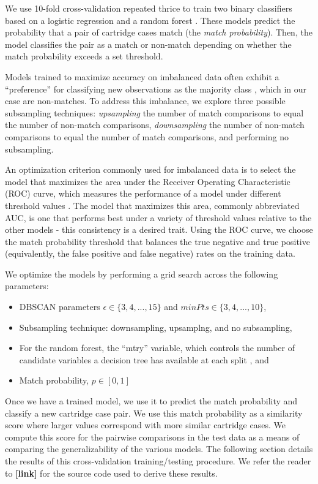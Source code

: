 \documentclass[reprint]{JASA}
\begin{document}
We use 10-fold cross-validation repeated thrice \citep{caret} to train
two binary classifiers based on a logistic regression and a random
forest \citep{breiman, randomForest}. These models predict the
probability that a pair of cartridge cases match (the \emph{match
probability}). Then, the model classifies the pair as a match or
non-match depending on whether the match probability exceeds a set
threshold.

Models trained to maximize accuracy on imbalanced data often exhibit a
``preference'' for classifying new observations as the majority class
\citep{Fernndez2018}, which in our case are non-matches. To address this
imbalance, we explore three possible subsampling techniques:
\emph{upsampling} the number of match comparisons to equal the number of
non-match comparisons, \emph{downsampling} the number of non-match
comparisons to equal the number of match comparisons, and performing no
subsampling.

An optimization criterion commonly used for imbalanced data is to select
the model that maximizes the area under the Receiver Operating
Characteristic (ROC) curve, which measures the performance of a model
under different threshold values \citep{James2013}. The model that
maximizes this area, commonly abbreviated AUC, is one that performs best
under a variety of threshold values relative to the other models - this
consistency is a desired trait. Using the ROC curve, we choose the match
probability threshold that balances the true negative and true positive
(equivalently, the false positive and false negative) rates on the
training data.

We optimize the models by performing a grid search across the following
parameters:

\begin{itemize}
\item
  DBSCAN parameters \(\epsilon \in \{3,4,...,15\}\) and
  \(minPts \in \{3,4,...,10\}\),
\item
  Subsampling technique: downsampling, upsamplng, and no subsampling,
\item
  For the random forest, the ``mtry'' variable, which controls the
  number of candidate variables a decision tree has available at each
  split \citep{breiman}, and
\item
  Match probability, \(p \in [0,1]\)
\end{itemize}

Once we have a trained model, we use it to predict the match probability
and classify a new cartridge case pair. We use this match probability as
a similarity score where larger values correspond with more similar
cartridge cases. We compute this score for the pairwise comparisons in
the test data as a means of comparing the generalizability of the
various models. The following section details the results of this
cross-validation training/testing procedure. We refer the reader to
\textbf{{[}link{]}} for the source code used to derive these results.
\end{document}
